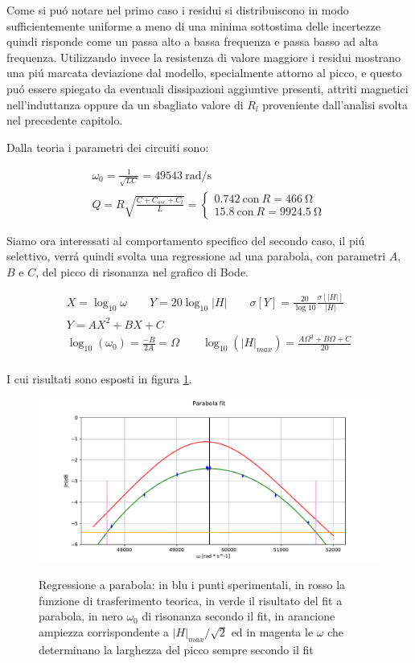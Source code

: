 \documentclass{article}
\begin{document}
Come si pu\'o notare nel primo caso i residui si distribuiscono in modo sufficientemente uniforme a meno di una minima sottostima delle incertezze quindi risponde come un passa alto a bassa frequenza e passa basso ad alta frequenza. Utilizzando invece la resistenza di valore maggiore i residui mostrano una pi\'u marcata deviazione dal modello, specialmente attorno al picco, e questo pu\'o essere spiegato da eventuali dissipazioni aggiuntive presenti, attriti magnetici nell'induttanza oppure da un sbagliato valore di $R_l$ proveniente dall'analisi svolta nel precedente capitolo.

Dalla teoria i parametri dei circuiti sono:

\begin{gather}
	\nonumber
	\omega_0 = \frac{1}{\sqrt{LC}} = 49543\ \si{\radian\per\second} \\
	\nonumber
	Q = R \sqrt{\frac{C+C_{osc}+C_l}{L}} = 
	\begin{cases}  
	0.742 \ \mathrm{con} \  R=466\ \si{\ohm} \\
	15.8 \  \mathrm{con}\  R=9924.5\ \si{\ohm}
	\end{cases}
\end{gather}

Siamo ora interessati al comportamento specifico del secondo caso, il pi\'u selettivo, verr\'a quindi svolta una regressione ad una parabola, con parametri $A$, $B$ e $C$, del picco di risonanza nel grafico di Bode.

\begin{gather}
	\nonumber
	X=\log_{10}{\omega} \qquad
	Y=20 \log_{10}{|H|} \qquad
	\sigma[Y]=\frac{20}{\log{10}} \frac{\sigma[|H|]}{|H|} \\
	Y=A X^2 + B X + C \\
	\log_{10}{(\omega_0)} = \frac{-B}{2A} = \Omega \qquad 
	\log_{10}{(|H|_{max})} = \frac{A \Omega^2 + B \Omega + C}{20} \\
\end{gather}

I cui risultati sono esposti in figura \ref{fig:figp}.

\begin{figure}[h]
\centering
\includegraphics[width=\textwidth]{figp.pdf}
\label{fig:figp}
\caption{Regressione a parabola: in blu i punti sperimentali, in rosso la funzione di trasferimento teorica, in verde il risultato del fit a parabola, in nero $\omega_0$ di risonanza secondo il fit, in arancione ampiezza corrispondente a $|H|_{max}/\sqrt{2}$ ed in magenta le $\omega$ che determinano la larghezza del picco sempre secondo il fit}
\end{figure}
\end{document}
